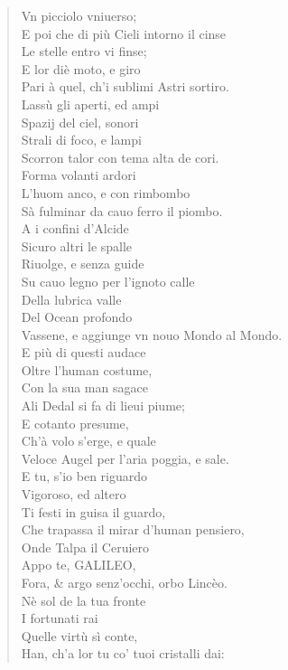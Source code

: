 \documentclass[11pt,twoside,openany]{book}
\begin{document}
\begin{verse}
Vn picciolo vniuerso; \\
E poi che di più Cieli intorno il cinse \\
Le stelle entro vi finse; \\
E lor diè moto, e giro \\
Pari à quel, ch'i sublimi Astri sortiro. \\[0.8em]
Lassù gli aperti, ed ampi \\
Spazij del ciel, sonori \\
Strali di foco, e lampi \\
Scorron talor con tema alta de cori. \\
Forma volanti ardori \\
L'huom anco, e con rimbombo \\
Sà fulminar da cauo ferro il piombo. \\[0.8em]
A i confini d'Alcide \\
Sicuro altri le spalle \\
Riuolge, e senza guide \\
Su cauo legno per l'ignoto calle \\
Della lubrica valle \\
Del Ocean profondo \\
Vassene, e aggiunge vn nouo Mondo al Mondo. \\[0.8em]
E più di questi audace \\
Oltre l'human costume, \\
Con la sua man sagace \\
Ali Dedal si fa di lieui piume; \\
E cotanto presume, \\
Ch'à volo s'erge, e quale \\
Veloce Augel per l'aria poggia, e sale. \\[0.8em]
E tu, s'io ben riguardo \\
Vigoroso, ed altero \\
Ti festi in guisa il guardo, \\
Che trapassa il mirar d'human pensiero, \\
Onde Talpa il Ceruiero \\
Appo te, GALILEO, \\
Fora, \& argo senz'occhi, orbo Lincèo. \\[0.8em]
Nè sol de la tua fronte \\
I fortunati rai \\
Quelle virtù sì conte, \\
Han, ch'a lor tu co' tuoi cristalli dai: \\

\end{verse}
\end{document}
